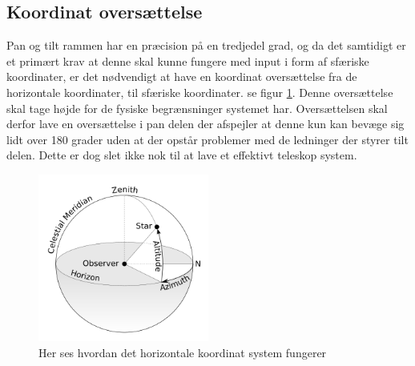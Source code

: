 
\subsection{Koordinat oversættelse}

\label{subsec:koordinat}

Pan og tilt rammen har en præcision på en tredjedel grad, og da det samtidigt er et primært krav at denne skal kunne fungere med input i form af sfæriske koordinater, er det nødvendigt at have en koordinat oversættelse fra de horizontale koordinater, til sfæriske koordinater. se figur \ref{fig:Horizontal}. Denne oversættelse skal tage højde for de fysiske begrænsninger systemet har. Oversættelsen skal derfor lave en oversættelse i pan delen der afspejler at denne kun kan bevæge sig lidt over 180 grader uden at der opstår problemer med de ledninger der styrer tilt delen. Dette er dog slet ikke nok til at lave et effektivt teleskop system.
\begin{figure}[!h]
	\begin{center}
		\includegraphics[width=0.5\textwidth]{Billeder/Horizontal.png}
	\end{center}		
	\caption{Her ses hvordan det horizontale koordinat system fungerer}
	\label{fig:Horizontal}
\end{figure}


